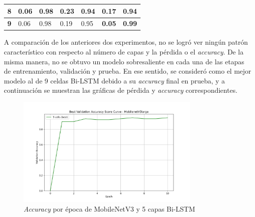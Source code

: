 \begin{table}[h!]
\begin{tabular}{|l|l|l|l|l|l|l|}
\textbf{8}                                                         & 0.06                                                                      & 0.98                                                                       & 0.23                                                                   & 0.94                                                                    & 0.17                                                               & 0.94                                                                \\ \hline
\textbf{9}                                                         & 0.06                                                                      & 0.98                                                                       & 0.19                                                                   & 0.95                                                                    & \textbf{0.05}                                                      & \textbf{0.99}                                                       \\ \hline
\end{tabular}
\label{table:MobileNetV3Metrics}
\end{table}

A comparación de los anteriores dos experimentos, no se logró ver 
ningún patrón característico con respecto al número de capas y la pérdida 
o el \textit{accuracy}. De la misma manera, no se obtuvo un modelo 
sobresaliente en cada una de las etapas de entrenamiento, validación y 
prueba. En ese sentido, se consideró como el mejor modelo al de 9 celdas 
Bi-LSTM debido a su \textit{accuracy} final en prueba, y a continuación 
se muestran las gráficas de pérdida y 
\textit{accuracy} correspondientes.\\

\begin{figure}[h!] 
    \includegraphics[width=0.8\textwidth]{../graphs/MobileNetV3large_best_val_accuracy.png} 
    \centering 
    \caption{\textit{Accuracy} por época de MobileNetV3 y 5 capas Bi-LSTM } 
    \label{MobileNetV3Accuracy} 
\end{figure}

